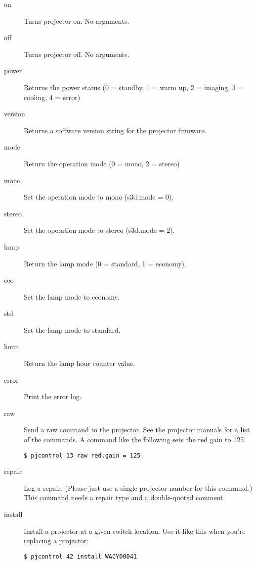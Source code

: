 \documentclass[11pt]{article}
\begin{document}
\begin{description}
\item[on] Turns projector on.  No arguments.

\item[off] Turns projector off.  No arguments.

\item[power] Returns the power status (0 = standby, 1 = warm up, 2 = imaging,
3 = cooling, 4 = error)

\item[version] Returns a software version string for the projector firmware.

\item[mode] Return the operation mode (0 = mono, 2 = stereo)

\item[mono] Set the operation mode to mono (s3d.mode = 0).

\item[stereo] Set the operation mode to stereo (s3d.mode = 2).

\item[lamp] Return the lamp mode (0 = standard, 1 = economy).

\item[eco] Set the lamp mode to economy.

\item[std] Set the lamp mode to standard.

\item[hour] Return the lamp hour counter value.

\item[error] Print the error log.

\item[raw] Send a raw command to the projector.  See the projector
  manuals for a list of the commands.  A command like the following
  sets the red gain to 125.

\begin{verbatim}
$ pjcontrol 13 raw red.gain = 125
\end{verbatim}

\item[repair] Log a repair.  (Please just use a single projector
  number for this command.)  This command needs a repair type and a
  double-quoted comment.

\item[install] Install a projector at a given switch location.  Use it
  like this when you're replacing a projector:

\begin{verbatim}
$ pjcontrol 42 install WACY00041
\end{verbatim}


\end{description}
\end{document}
